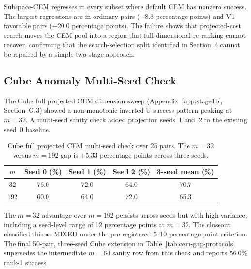 Subspace-CEM regresses in every subset where default CEM has nonzero
success.  The largest regressions are in ordinary pairs ($-8.3$ percentage
points) and V1-favorable pairs ($-20.0$ percentage points).  The failure
shows that projected-cost search moves the CEM pool into a region that
full-dimensional re-ranking cannot recover, confirming that the
search-selection split identified in Section~4 cannot be repaired by a
simple two-stage approach.

\subsection{Cube Anomaly Multi-Seed Check}
\label{app:negative_cube_anomaly}

The Cube full projected CEM dimension sweep (Appendix~\ref{app:stage1b},
Section~G.3) showed a non-monotonic inverted-U success pattern peaking at
$m=32$.  A multi-seed sanity check added projection seeds~1 and~2 to the
existing seed~0 baseline.

\begin{table}[h]
\centering
\caption{Cube full projected CEM multi-seed check over 25 pairs.  The
$m=32$ versus $m=192$ gap is +5.33 percentage points across three seeds.}
\label{tab:h-cube-anomaly}
\small
\begin{tabular}{ccccc}
\toprule
$m$ & Seed 0 (\%) & Seed 1 (\%) & Seed 2 (\%) & 3-seed mean (\%) \\
\midrule
32 & 76.0 & 72.0 & 64.0 & 70.7 \\
192 & 60.0 & 64.0 & 72.0 & 65.3 \\
\bottomrule
\end{tabular}
\end{table}

The $m=32$ advantage over $m=192$ persists across seeds but with high
variance, including a seed-level range of 12 percentage points at $m=32$.
The closeout classified this as MIXED under the pre-registered
5--10 percentage-point criterion.  The final 50-pair, three-seed Cube
extension in Table~\ref{tab:cem-gap-protocols} supersedes the intermediate
$m=64$ sanity row from this check and reports 56.0\% rank-1 success.
